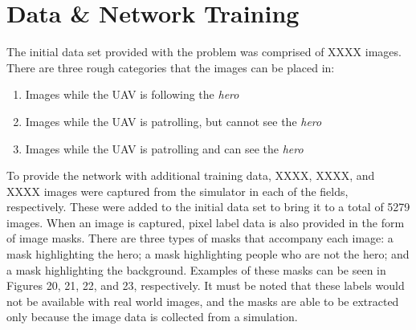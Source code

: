 \documentclass[a4paper]{article}
\begin{document}
\section{Data \& Network Training}
The initial data set provided with the problem was comprised of XXXX images. There are three rough categories that the images can be placed in:
\begin{enumerate}
\item Images while the UAV is following the \textit{hero}
\item Images while the UAV is patrolling, but cannot see the \textit{hero}
\item Images while the UAV is patrolling and can see the \textit{hero}
\end{enumerate}
To provide the network with additional training data, XXXX, XXXX, and XXXX images were captured from the simulator in each of the fields, respectively. These were added to the initial data set to bring it to a total of 5279 images. When an image is captured, pixel label data is also provided in the form of image masks. There are three types of masks that accompany each image: a mask highlighting the hero; a mask highlighting people who are not the hero; and a mask highlighting the background. Examples of these masks can be seen in Figures 20, 21, 22, and 23, respectively. It must be noted that these labels would not be available with real world images, and the masks are able to be extracted only because the image data is collected from a simulation.
\begin{figure}[h]
\begin{minipage}{0.45\textwidth}
\centering
{}
\end{minipage}
\hspace{1cm}
\begin{minipage}{0.45\textwidth}
\centering
{}
\end{minipage}
\end{figure}
\end{document}
